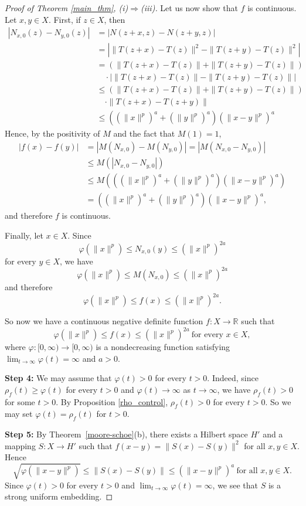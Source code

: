 \documentclass[a4paper,oneside]{amsart}
\theoremstyle{definition}
\begin{document}
\begin{proof}[Proof of Theorem \ref{main_thm}, (i)$\Rightarrow$(iii)]
Let us now show that $f$ is continuous. Let $x,y\in X$. First, if $z\in X$, then
\begin{align*}
|N_{x,0}(z)-N_{y,0}(z)|&=|N(z+x,z)-N(z+y,z)|\\
&=\left|\|T(z+x)-T(z)\|^2-\|T(z+y)-T(z)\|^2\right|\\
&=\left(\|T(z+x)-T(z)\|+\|T(z+y)-T(z)\|\right)\\
&\quad\cdot\left|\|T(z+x)-T(z)\|-\|T(z+y)-T(z)\|\right|\\
&\leq\left(\|T(z+x)-T(z)\|+\|T(z+y)-T(z)\|\right)\\
&\quad\cdot\|T(z+x)-T(z+y)\|\\
&\leq\left((\|x\|^p)^a+(\|y\|^p)^a\right)(\|x-y\|^p)^a
\end{align*}
Hence, by the positivity of $M$ and the fact that $M(1)=1$,
\begin{align*}
|f(x)-f(y)|&=|M(N_{x,0})-M(N_{y,0})|=|M(N_{x,0}-N_{y,0})|\\
&\leq M(|N_{x,0}-N_{y,0}|)\\
&\leq M\left(\left((\|x\|^p)^a+(\|y\|^p)^a\right)(\|x-y\|^p)^a\right)\\
&=\left((\|x\|^p)^a+(\|y\|^p)^a\right)(\|x-y\|^p)^a,
\end{align*}
and therefore $f$ is continuous.

Finally, let $x\in X$. Since
$$\varphi(\|x\|^p)\leq N_{x,0}(y)\leq(\|x\|^p)^{2a}$$
for every $y\in X$, we have
$$\varphi(\|x\|^p)\leq M(N_{x,0})\leq(\|x\|^p)^{2a}$$
and therefore
$$\varphi(\|x\|^p)\leq f(x)\leq(\|x\|^p)^{2a}.$$

So now we have a continuous negative definite function $f:X\to{\mathbb{R}}$ such that
$$\varphi(\|x\|^p)\leq f(x)\leq(\|x\|^p)^{2a}\ \text{for every }x\in X,$$
where $\varphi:[0,\infty)\to[0,\infty)$ is a nondecreasing function satisfying $\lim_{t\to\infty}\varphi(t)=\infty$ and $a>0$.

\textbf{Step 4:} We may assume that $\varphi(t)>0$ for every $t>0$. Indeed, since $\rho_f(t)\geq\varphi(t)$ for every $t>0$ and $\varphi(t)\to\infty$ as $t\to\infty$, we have $\rho_f(t)>0$ for some $t>0$. By Proposition \ref{rho_control}, $\rho_f(t)>0$ for every $t>0$. So we may set $\varphi(t)=\rho_f(t)$ for $t>0$.

\textbf{Step 5:} By Theorem~\ref{moore-schoe}(b), there exists a Hilbert space $H'$ and a mapping $S:X\to H'$ such that $f(x-y)=\|S(x)-S(y)\|^2$ for all $x,y\in X$. Hence
$$\sqrt{\varphi(\|x-y\|^p)}\leq\|S(x)-S(y)\|\leq(\|x-y\|^p)^a\ \text{for all }x,y\in X.$$
Since $\varphi(t)>0$ for every $t>0$ and $\lim_{t\to\infty}\varphi(t)=\infty$, we see that $S$ is a strong uniform embedding.
\end{proof}
\end{document}
